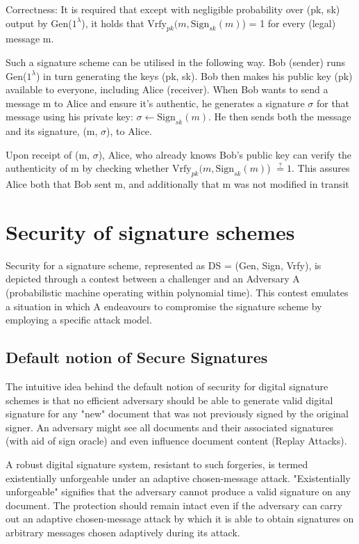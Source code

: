 \documentclass[]{final_report}
\theoremstyle{definition}
\begin{document}
Correctness: It is required that except with negligible probability over (pk, sk) output by Gen($1^\lambda$), it holds that $\text{Vrfy}_{pk} (m, \text{Sign}_{sk}(m)$) = 1 for every (legal) message m. 

Such a signature scheme can be utilised in the following way. 
Bob (sender) runs Gen($1^\lambda$) in turn generating the keys (pk, sk). Bob then makes his public key (pk) available to everyone, including Alice (receiver). 
When Bob wants to send a message m to Alice and ensure it's authentic, he generates a signature $\sigma$ for that message using his private key: $\sigma \leftarrow \text{Sign}_{sk}(m)$. He then sends both the message and its signature, (m, $\sigma$), to Alice.

Upon receipt of (m, $\sigma$), Alice, who already knows Bob's public key can verify the authenticity of m by checking whether $\text{Vrfy}_{pk} (m, \text{Sign}_{sk}(m)$) $\stackrel{?}{=} 1$. This assures Alice both that Bob sent m, and additionally that m was not modified in transit

\section{Security of signature schemes}
Security for a signature scheme, represented as DS = (Gen, Sign, Vrfy), is depicted through a contest between a challenger and an Adversary A (probabilistic machine operating within polynomial time). This contest emulates a situation in which A endeavours to compromise the signature scheme by employing a specific attack model. 

\subsection{Default notion of Secure Signatures}
The intuitive idea behind the default notion of security for digital signature schemes is that no efficient adversary should be able to generate valid digital signature for any "new" document that was not previously signed by the original signer.
An adversary might see all documents and their associated signatures (with aid of sign oracle) and even influence document content (Replay Attacks).

A robust digital signature system, resistant to such forgeries, is termed existentially unforgeable under an adaptive chosen-message attack. "Existentially unforgeable" signifies that the adversary cannot produce a valid signature on any document. The protection should remain intact even if the adversary can carry out an adaptive chosen-message attack by which it is able to obtain signatures on arbitrary messages chosen adaptively during its attack.
\end{document}
